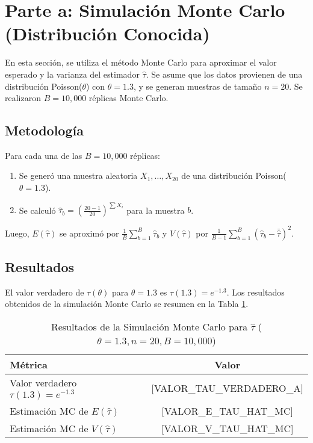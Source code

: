 \documentclass[11pt,a4paper]{article}
\begin{document}
\section{Parte a: Simulación Monte Carlo (Distribución Conocida)}
En esta sección, se utiliza el método Monte Carlo para aproximar el valor esperado y la varianza del estimador $\hat{\tau}$. Se asume que los datos provienen de una distribución Poisson($\theta$) con $\theta = 1.3$, y se generan muestras de tamaño $n=20$. Se realizaron $B = 10,000$ réplicas Monte Carlo.

\subsection{Metodología}
Para cada una de las $B=10,000$ réplicas:
\begin{enumerate}
    \item Se generó una muestra aleatoria $X_1, \dots, X_{20}$ de una distribución Poisson($\theta=1.3$).
    \item Se calculó $\hat{\tau}_b = \left(\frac{20-1}{20}\right)^{\sum X_i}$ para la muestra $b$.
\end{enumerate}
Luego, $E(\hat{\tau})$ se aproximó por $\frac{1}{B}\sum_{b=1}^B \hat{\tau}_b$ y $V(\hat{\tau})$ por $\frac{1}{B-1}\sum_{b=1}^B (\hat{\tau}_b - \bar{\hat{\tau}})^2$.

\subsection{Resultados}
El valor verdadero de $\tau(\theta)$ para $\theta=1.3$ es $\tau(1.3) = e^{-1.3}$.
Los resultados obtenidos de la simulación Monte Carlo se resumen en la Tabla \ref{tab:mc_results}.

\begin{table}[H]
    \centering
    \caption{Resultados de la Simulación Monte Carlo para $\hat{\tau}$ ($\theta=1.3, n=20, B=10,000$)}
    \label{tab:mc_results}
    \begin{tabular}{lc}
        \toprule
        Métrica & Valor \\
        \midrule
        Valor verdadero $\tau(1.3) = e^{-1.3}$ & [VALOR_TAU_VERDADERO_A] \\
        Estimación MC de $E(\hat{\tau})$ & [VALOR_E_TAU_HAT_MC] \\
        Estimación MC de $V(\hat{\tau})$ & [VALOR_V_TAU_HAT_MC] \\
        \bottomrule
    \end{tabular}
\end{table}
\end{document}
